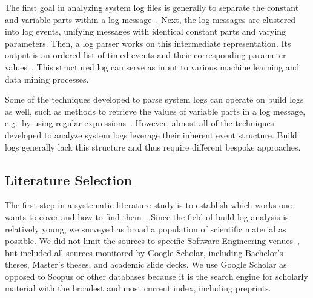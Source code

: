 The first goal in analyzing system log files is generally to
separate the constant and variable parts within a log
message~\cite{nagappan2010abstracting,he2017towards}.
Next, the log
messages are clustered into log events, unifying messages with
identical constant parts and varying parameters.
Then, a log parser works on this intermediate representation.
Its output is an ordered list of timed events and their corresponding
parameter values~\cite{he2016evaluation}.
This structured log can serve as input to various machine learning and
data mining processes.

Some of the techniques developed to parse system logs can operate
on build logs as well, such as methods to retrieve the
values of variable parts in a log message, e.g.\, by using regular
expressions~\cite{nagappan2010abstracting,xu2009detecting}.
However, almost all of the techniques developed to analyze system logs
leverage their inherent event structure.
Build logs generally lack this structure and thus require different
bespoke approaches.

\subsection{Literature Selection}
The first step in a systematic literature study is to establish which works one wants to cover and how to find them~\cite{kitchenham2009systematic}.
Since the field of build log analysis is relatively young, we
surveyed as broad a population of scientific material as possible.
We did not limit the sources to specific Software Engineering
venues~\cite{petersen2015guidelines}, but included all sources
monitored by Google Scholar, including Bachelor's theses, Master's
theses, and academic slide decks.
We use Google Scholar as opposed to Scopus or
other databases because it is the search engine for scholarly material with
the broadest and most current index, including preprints.

